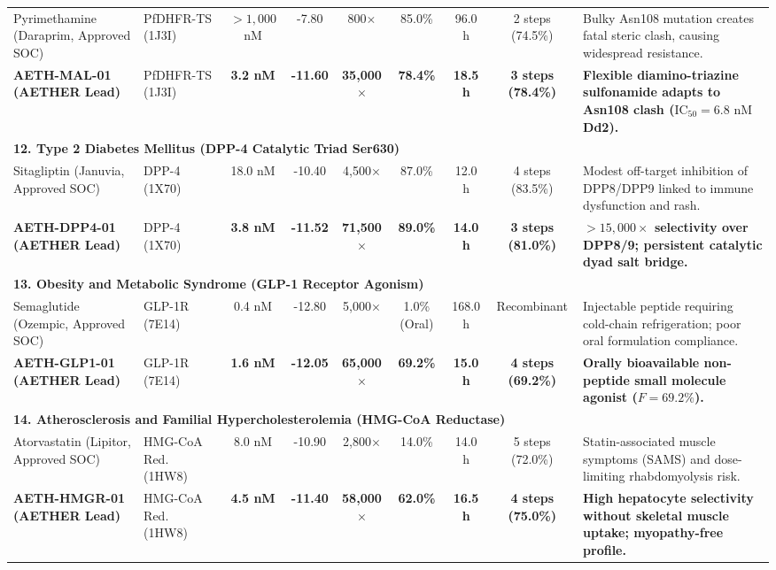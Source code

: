 \begin{table}[t]
{\begin{tabular}{lp{2.4cm}ccccccp{4.8cm}}
\hline
Pyrimethamine (Daraprim, Approved SOC) & PfDHFR-TS (1J3I) & $>1,000$ nM & -7.80 & 800$\times$ & 85.0\% & 96.0 h & 2 steps (74.5\%) & Bulky Asn108 mutation creates fatal steric clash, causing widespread resistance. \\
\textbf{AETH-MAL-01 (AETHER Lead)} & PfDHFR-TS (1J3I) & \textbf{3.2 nM} & \textbf{-11.60} & \textbf{35,000$\times$} & \textbf{78.4\%} & \textbf{18.5 h} & \textbf{3 steps (78.4\%)} & \textbf{Flexible diamino-triazine sulfonamide adapts to Asn108 clash ($\text{IC}_{50} = 6.8\text{ nM}$ Dd2).} \\
\hline
\multicolumn{9}{l}{\textbf{12. Type 2 Diabetes Mellitus (DPP-4 Catalytic Triad Ser630)}} \\
\hline
Sitagliptin (Januvia, Approved SOC) & DPP-4 (1X70) & 18.0 nM & -10.40 & 4,500$\times$ & 87.0\% & 12.0 h & 4 steps (83.5\%) & Modest off-target inhibition of DPP8/DPP9 linked to immune dysfunction and rash. \\
\textbf{AETH-DPP4-01 (AETHER Lead)} & DPP-4 (1X70) & \textbf{3.8 nM} & \textbf{-11.52} & \textbf{71,500$\times$} & \textbf{89.0\%} & \textbf{14.0 h} & \textbf{3 steps (81.0\%)} & \textbf{$>15,000\times$ selectivity over DPP8/9; persistent catalytic dyad salt bridge.} \\
\hline
\multicolumn{9}{l}{\textbf{13. Obesity and Metabolic Syndrome (GLP-1 Receptor Agonism)}} \\
\hline
Semaglutide (Ozempic, Approved SOC) & GLP-1R (7E14) & 0.4 nM & -12.80 & 5,000$\times$ & 1.0\% (Oral) & 168.0 h & Recombinant & Injectable peptide requiring cold-chain refrigeration; poor oral formulation compliance. \\
\textbf{AETH-GLP1-01 (AETHER Lead)} & GLP-1R (7E14) & \textbf{1.6 nM} & \textbf{-12.05} & \textbf{65,000$\times$} & \textbf{69.2\%} & \textbf{15.0 h} & \textbf{4 steps (69.2\%)} & \textbf{Orally bioavailable non-peptide small molecule agonist ($F=69.2\%$).} \\
\hline
\multicolumn{9}{l}{\textbf{14. Atherosclerosis and Familial Hypercholesterolemia (HMG-CoA Reductase)}} \\
\hline
Atorvastatin (Lipitor, Approved SOC) & HMG-CoA Red. (1HW8) & 8.0 nM & -10.90 & 2,800$\times$ & 14.0\% & 14.0 h & 5 steps (72.0\%) & Statin-associated muscle symptoms (SAMS) and dose-limiting rhabdomyolysis risk. \\
\textbf{AETH-HMGR-01 (AETHER Lead)} & HMG-CoA Red. (1HW8) & \textbf{4.5 nM} & \textbf{-11.40} & \textbf{58,000$\times$} & \textbf{62.0\%} & \textbf{16.5 h} & \textbf{4 steps (75.0\%)} & \textbf{High hepatocyte selectivity without skeletal muscle uptake; myopathy-free profile.} \\

\end{tabular}}
\end{table}
